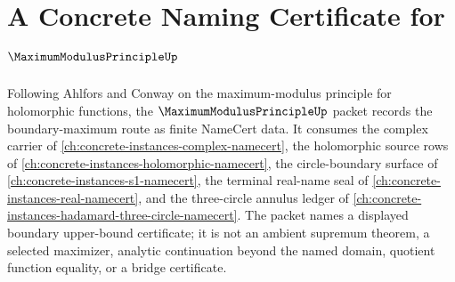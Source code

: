 \chapter{A Concrete Naming Certificate for $\MaximumModulusPrincipleUp$}
\label{ch:concrete-instances-maximum-modulus-principle-namecert}

Following Ahlfors and Conway on the maximum-modulus principle for holomorphic functions, the $\MaximumModulusPrincipleUp$ packet records the boundary-maximum route as finite NameCert data. It consumes the complex carrier of \autoref{ch:concrete-instances-complex-namecert}, the holomorphic source rows of \autoref{ch:concrete-instances-holomorphic-namecert}, the circle-boundary surface of \autoref{ch:concrete-instances-s1-namecert}, the terminal real-name seal of \autoref{ch:concrete-instances-real-namecert}, and the three-circle annulus ledger of \autoref{ch:concrete-instances-hadamard-three-circle-namecert}. The packet names a displayed boundary upper-bound certificate; it is not an ambient supremum theorem, a selected maximizer, analytic continuation beyond the named domain, quotient function equality, or a bridge certificate.

